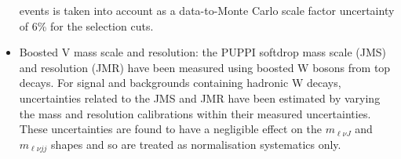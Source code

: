 \begin{itemize}
  events is taken into account as a data-to-Monte Carlo scale factor uncertainty of 6\% for the selection cuts. 
\item Boosted V mass scale and resolution: the PUPPI softdrop mass scale (JMS)  and resolution (JMR) have been measured using boosted
W bosons from top decays. For signal and backgrounds containing hadronic W decays, uncertainties 
related to the JMS and JMR have been estimated by varying the mass and resolution
calibrations within their measured uncertainties.
These uncertainties are found to have a negligible effect on the $m_{\ell \nu J}$ and $m_{\ell \nu jj}$ shapes
and so are treated as normalisation systematics only.
\end{itemize}

